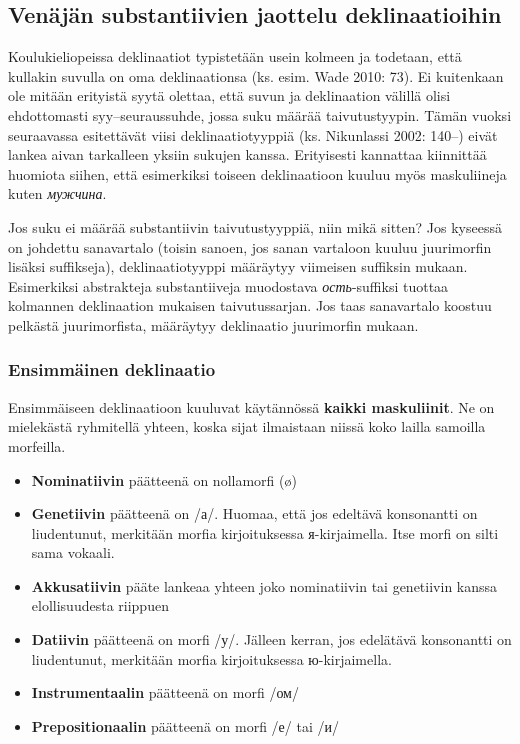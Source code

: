 \documentclass[]{scrartcl}
\providecommand{\tightlist}{%
  \setlength{\itemsep}{0pt}\setlength{\parskip}{0pt}}
\begin{document}
\subsection{Venäjän substantiivien jaottelu
deklinaatioihin}\label{venuxe4juxe4n-substantiivien-jaottelu-deklinaatioihin}

Koulukieliopeissa deklinaatiot typistetään usein kolmeen ja todetaan,
että kullakin suvulla on oma deklinaationsa (ks. esim. Wade 2010: 73).
Ei kuitenkaan ole mitään erityistä syytä olettaa, että suvun ja
deklinaation välillä olisi ehdottomasti syy--seuraussuhde, jossa suku
määrää taivutustyypin. Tämän vuoksi seuraavassa esitettävät viisi
deklinaatiotyyppiä (ks. Nikunlassi 2002: 140--) eivät lankea aivan
tarkalleen yksiin sukujen kanssa. Erityisesti kannattaa kiinnittää
huomiota siihen, että esimerkiksi toiseen deklinaatioon kuuluu myös
maskuliineja kuten \emph{мужчина}.

Jos suku ei määrää substantiivin taivutustyyppiä, niin mikä sitten? Jos
kyseessä on johdettu sanavartalo (toisin sanoen, jos sanan vartaloon
kuuluu juurimorfin lisäksi suffikseja), deklinaatiotyyppi määräytyy
viimeisen suffiksin mukaan. Esimerkiksi abstrakteja substantiiveja
muodostava \emph{ость}-suffiksi tuottaa kolmannen deklinaation mukaisen
taivutussarjan. Jos taas sanavartalo koostuu pelkästä juurimorfista,
määräytyy deklinaatio juurimorfin mukaan.

\subsubsection{Ensimmäinen
deklinaatio}\label{ensimmuxe4inen-deklinaatio}

Ensimmäiseen deklinaatioon kuuluvat käytännössä \textbf{kaikki
maskuliinit}. Ne on mielekästä ryhmitellä yhteen, koska sijat ilmaistaan
niissä koko lailla samoilla morfeilla.

\begin{itemize}
\tightlist
\item
  \textbf{Nominatiivin} päätteenä on nollamorfi (ø)
\item
  \textbf{Genetiivin} päätteenä on /а/. Huomaa, että jos edeltävä
  konsonantti on liudentunut, merkitään morfia kirjoituksessa
  я-kirjaimella. Itse morfi on silti sama vokaali.
\item
  \textbf{Akkusatiivin} pääte lankeaa yhteen joko nominatiivin tai
  genetiivin kanssa elollisuudesta riippuen
\item
  \textbf{Datiivin} päätteenä on morfi /у/. Jälleen kerran, jos
  edelätävä konsonantti on liudentunut, merkitään morfia kirjoituksessa
  ю-kirjaimella.
\item
  \textbf{Instrumentaalin} päätteenä on morfi /ом/
\item
  \textbf{Prepositionaalin} päätteenä on morfi /е/ tai /и/
\end{itemize}
\end{document}
